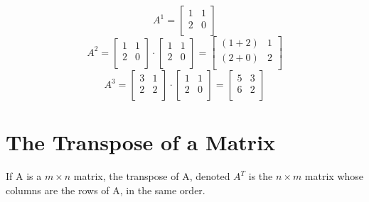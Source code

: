 \documentclass{article}
\begin{document}
\[ A^1=\left[
       \begin{array}{cc}
         1 & 1 \\
         2 & 0 \\
       \end{array}
     \right]
\]
\[
   A^2=\left[
       \begin{array}{cc}
         1 & 1 \\
         2 & 0 \\
       \end{array}
     \right]
     \cdot
     \left[
       \begin{array}{cc}
         1 & 1 \\
         2 & 0 \\
       \end{array}
     \right]
     =
     \left[
       \begin{array}{cc}
         (1+2) & 1 \\
         (2+0) & 2 \\
       \end{array}
     \right]
     \]
     \[
    A^3=\left[
       \begin{array}{cc}
         3 & 1 \\
         2 & 2 \\
       \end{array}
     \right]
     \cdot
     \left[
       \begin{array}{cc}
         1 & 1 \\
         2 & 0 \\
       \end{array}
     \right]
     =
     \left[
       \begin{array}{cc}
         5 & 3 \\
         6 & 2 \\
       \end{array}
     \right]
\]

\section{The Transpose of a Matrix}
If A is a $m{\times}n$ matrix, the transpose of A, denoted $A^T$ is
the $n{\times}m$ matrix whose columns are the rows of A, in the same
order.
\end{document}
